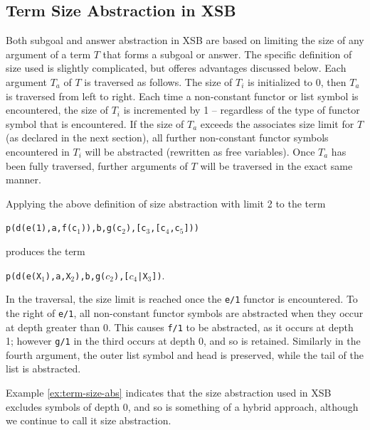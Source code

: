 \subsection{Term Size Abstraction in XSB} \label{sec:size-metric}
%
Both subgoal and answer abstraction in XSB are based on limiting the
size of any argument of a term $T$ that forms a subgoal or answer.
The specific definition of size used is slightly complicated, but
offeres advantages discussed below.  Each argument $T_a$ of $T$ is
traversed as follows.  The size of $T_i$ is initialized to 0, then
$T_a$ is traversed from left to right.  Each time a non-constant
functor or list symbol is encountered, the size of $T_i$ is
incremented by 1 -- regardless of the type of functor symbol that is
encountered.  If the size of $T_a$ exceeds the associates size limit
for $T$ (as declared in the next section), all further non-constant
functor symbols encountered in $T_i$ will be abstracted (rewritten as
free variables).  Once $T_a$ has been fully traversed, further
arguments of $T$ will be traversed in the exact same manner.


\begin{example} \label{ex:term-size-abs}
Applying the above definition of size abstraction with limit 2 to the
term 

{\tt p(d(e(1),a,f(c$_1$)),b,g(c$_2$),[c$_3$,[c$_4$,c$_5$]))}

\noindent
  produces the term 

{\tt p(d(e(X$_1$),a,X$_2$),b,g($c_2$),[$c_4$|X$_3$])}.  

\noindent
In the traversal, the size limit is reached once the {\tt e/1} functor
is encountered.  To the right of {\tt e/1}, all non-constant functor
symbols are abstracted when they occur at depth greater than 0.  This
causes {\tt f/1} to be abstracted, as it occurs at depth 1; however
{\tt g/1} in the third occurs at depth 0, and so is retained.
Similarly in the fourth argument, the outer list symbol and head is
preserved, while the tail of the list is abstracted.
\end{example}

Example \ref{ex:term-size-abs} indicates that the size abstraction
used in XSB excludes symbols of depth 0, and so is something of a
hybrid approach, although we continue to call it size abstraction.

